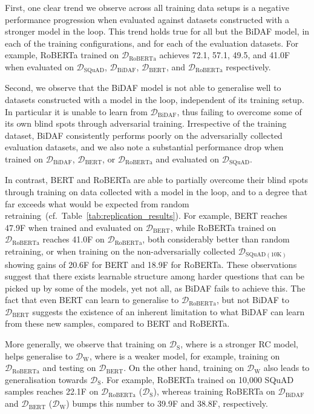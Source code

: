\documentclass[11pt,a4paper]{article}
\newcommand{\dataset}[1]{\ensuremath{\mathcal{D_{\mathrm{#1}}}}}
\newcommand{\squad}{SQuAD}
\begin{document}
First, one clear trend we observe across all training data setups is a negative performance progression when evaluated against datasets constructed with a stronger model in the loop.
This trend holds true for all but the BiDAF model, in each of the training configurations, and for each of the evaluation datasets. 
For example, RoBERTa trained on \dataset{RoBERTa} achieves 72.1, 57.1, 49.5, and 41.0F when evaluated on \dataset{SQuAD}, \dataset{BiDAF}, \dataset{BERT}, and \dataset{RoBERTa} respectively.


Second, we observe that the BiDAF model is not able to generalise well to datasets constructed with a model in the loop, independent of its training setup.
In particular it is unable to learn from \dataset{BiDAF}, thus failing to overcome some of its own blind spots through adversarial training.
Irrespective of the training dataset, BiDAF consistently performs poorly on the adversarially collected evaluation datasets, and we also note a substantial performance drop when trained on \dataset{BiDAF}, \dataset{BERT}, or \dataset{RoBERTa} and evaluated on \dataset{SQuAD}.


In contrast, BERT and RoBERTa are able to partially overcome their blind spots through training on data collected with a model in the loop, and to a degree that far exceeds what would be expected from random retraining~(cf.~Table~\ref{tab:replication_results}).
For example, BERT reaches 47.9F when trained and evaluated on \dataset{BERT}, while RoBERTa trained on \dataset{RoBERTa} reaches 41.0F on \dataset{RoBERTa}, both considerably better than random retraining, or when training on the non-adversarially collected \dataset{SQuAD(10K)} showing gains of 20.6F for BERT and 18.9F for RoBERTa.
These observations suggest that there exists learnable structure among harder questions that can be picked up by some of the models, yet not all, as BiDAF fails to achieve this.
The fact that even BERT can learn to generalise to \dataset{RoBERTa}, but not BiDAF to \dataset{BERT} suggests the existence of an inherent limitation to what BiDAF can learn from these new samples, compared to BERT and RoBERTa.


More generally, we observe that training on \dataset{S}, where  is a stronger RC model, helps generalise to \dataset{W}, where  is a weaker model, for example, training on \dataset{RoBERTa} and testing on \dataset{BERT}.
On the other hand, training on \dataset{W} also leads to generalisation towards \dataset{S}. 
For example, RoBERTa trained on 10,000 \squad{} samples reaches 22.1F on \dataset{RoBERTa} (\dataset{S}), whereas training RoBERTa on \dataset{BiDAF} and \dataset{BERT} (\dataset{W}) bumps this number to 39.9F and 38.8F, respectively.
\end{document}
